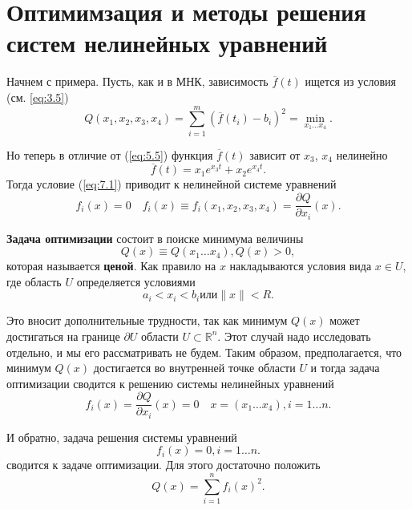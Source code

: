 \section{Оптимимзация и методы решения систем нелинейных уравнений}
\label{lecture:7}

Начнем с примера. Пусть, как и в МНК, зависимость $\overline{f}(t)$ ищется из условия (см. \ref{eq:3.5})
\begin{equation} \label{eq:7.1}
	Q(x_1, x_2, x_3, x_4) = \sum^m_{i=1}{(\overline{f}(t_i)-b_i)^2} = \min_{x_1 \dots x_4}.
\end{equation}

Но теперь в отличие от (\ref{eq:5.5}) функция $\overline{f}(t)$ зависит от $x_3$, $x_4$ нелинейно
\begin{equation} \label{eq:7.2}
	\overline{f}(t) = x_1e^{x_3 t} + x_2e^{x_4 t}.
\end{equation}
Тогда условие (\ref{eq:7.1}) приводит к нелинейной системе уравнений
\begin{equation} \label{eq:7.3}
	f_i(x) = 0 \quad
	f_i(x) \equiv f_i(x_1, x_2, x_3, x_4) = \frac{\partial Q}{\partial x_i}(x).
\end{equation}

\textbf{Задача оптимизации} состоит в поиске минимума величины 
\begin{equation} \label{eq:7.4}
	Q(x) \equiv Q(x_1 \dots x_4), Q(x) > 0,
\end{equation}
которая называется \textbf{ценой}. Как правило на $x$ накладываются условия вида $x \in U$, где область $U$ определяется условиями
\begin{equation} \label{eq:7.5}
	a_i < x_i < b_i \textrm{или} \|x\| < R.
\end{equation}

Это вносит дополнительные трудности, так как минимум $Q(x)$ может достигаться на границе $\partial U$  области $U \subset \mathbb{R}^n$. Этот случай надо исследовать отдельно, и мы его рассматривать не будем. Таким образом, предполагается, что минимум $Q(x)$ достигается во внутренней точке области $U$ и тогда задача оптимизации сводится к решению системы нелинейных уравнений
\begin{equation} \label{eq:7.6}
	f_i(x) = \frac{\partial Q}{\partial x_i}(x) = 0 \quad x = (x_1 \dots x_4), i = 1 \dots n.
\end{equation}

И обратно, задача решения системы уравнений
\begin{equation} \label{eq:7.7}
	f_i(x) = 0, i = 1 \dots n.
\end{equation}
сводится к задаче оптимизации. Для этого достаточно положить
\begin{equation} \label{eq:7.8}
	Q(x) = \sum^n_{i=1}{f_i(x)^2}.
\end{equation}

